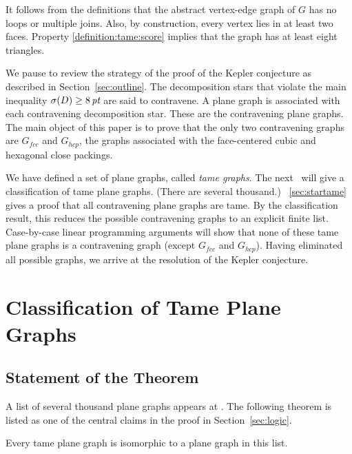 %
It follows from the definitions that the abstract vertex-edge
graph of $G$ has no loops or multiple joins.  Also, by
construction, every vertex lies in at least two faces. Property
\ref{definition:tame:score} implies that the graph has at least
        eight triangles.

\begin{remark}
We pause to review the strategy of the proof of the Kepler
conjecture as described in Section~\ref{sec:outline}. The
decomposition stars that violate the main inequality $\sigma(D)\ge
8\,\hbox{\it pt}$ are said to contravene.  A plane graph is associated with
each contravening decomposition star.  These are the contravening
plane graphs. The main object of this paper is to prove that the
only two contravening graphs are $G_{fcc}$ and $G_{hcp}$, the graphs
associated with the face-centered cubic and hexagonal close
packings.

We have defined a set of plane graphs, called {\it tame graphs}. The
next \chap\ will give a classification of tame plane graphs. (There
are several thousand.) \Chap~\ref{sec:startame} gives a proof that
all contravening plane graphs are tame.  By the classification
result, this reduces the possible contravening graphs to an explicit
finite list.  Case-by-case linear programming arguments will show
that none of these tame plane graphs is a contravening graph (except
$G_{fcc}$ and $G_{hcp}$).  Having eliminated all possible graphs, we
arrive at the resolution of the Kepler conjecture.
\end{remark}




\chapter{Classification of Tame Plane Graphs}
    \label{sec:proof-classification}

\section{Statement of the Theorem}
\label{sec:classification}

A list of several thousand plane graphs appears at \cite{web}. The
following theorem is listed as one of the central claims in the
proof in Section~\ref{sec:logic}.

\begin{theorem}
\label{theorem:classification} Every tame plane graph is
isomorphic to a plane graph in this list.
\end{theorem}

